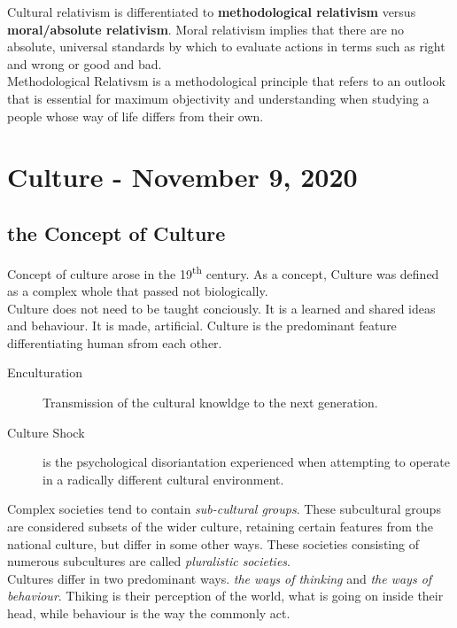 \documentclass[11pt,a4paper]{book}
\begin{document}
Cultural relativism is differentiated to \textbf{methodological relativism} versus \textbf{moral/absolute relativism}. Moral relativism implies that there are no absolute, universal standards by which to evaluate actions in terms such as right and wrong or good and bad.\\

Methodological Relativsm is a methodological principle that refers to an outlook that is essential for maximum objectivity and understanding when studying a people whose way of life differs from their own.

\chapter{Culture - November 9, 2020}

\section{the Concept of Culture}
Concept of culture arose in the 19\textsuperscript{th} century. As a concept, Culture was defined as a complex whole that passed not biologically.\\

Culture does not need to be taught conciously. It is a learned and shared ideas and behaviour. It is made, artificial. Culture is the predominant feature differentiating human sfrom each other.\\

\begin{description}
\item[Enculturation] Transmission of the cultural knowldge to the next generation.
\item[Culture Shock] is the psychological disoriantation experienced when attempting to operate in a radically different cultural environment.
\end{description}

Complex societies tend to contain \textit{sub-cultural groups}. These subcultural groups are considered subsets of the wider culture, retaining certain features from the national culture, but differ in some other ways. These societies consisting of numerous subcultures are called \textit{pluralistic societies}.\\

Cultures differ in two predominant ways. \textit{the ways of thinking} and \textit{the ways of behaviour}. Thiking is their perception of the world, what is going on inside their head, while behaviour is the way the commonly act.
\end{document}
